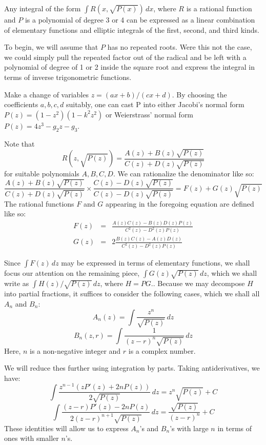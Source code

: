 \documentclass[12pt]{article}
\begin{document}
Any integral of the form $\int R(x,\sqrt{P(x)}) \, dx$, where $R$ is a rational 
function and $P$ is a polynomial of degree 3 or 4 can be expressed as a linear 
combination of elementary functions and elliptic integrals of the first, second, 
and third kinds.

To begin, we will assume that $P$ has no repeated roots.  Were this not the case, 
we could simply pull the repeated factor out of the radical and be left with a 
polynomial of degree of 1 or 2 inside the square root and express the integral in 
terms of inverse trigonometric functions.

Make a change of variables $z = (a x + b) / (c x + d)$.  By choosing the coefficients 
$a, b, c, d$ suitably, one can cast P into either Jacobi's normal form 
$P(z) = (1 - z^2) (1 - k^2 z^2)$ or Weierstrass' normal form 
$P(z) = 4 z^3 - g_2 z - g_3$.

Note that 
 \[R (z, \sqrt{P(z)}) = \frac{A(z) + B(z) \sqrt{P(z)}}{C(z) + D(z) \sqrt{P(z)}}\]
for suitable polynomials $A, B, C, D$.  We can rationalize the denominator like so:
 \[\frac{A(z) + B(z) \sqrt{P(z)}}{C(z) + D(z) \sqrt{P(z)}} \times \frac{C(z) -
D(z) \sqrt{P(z)}}{C(z) - D(z) \sqrt{P(z)}} = F(z) + G(z) \sqrt{P(z)}\]
The rational functions $F$ and $G$ appearing in the foregoing equation are defined like so:
\begin{eqnarray*} F(z) &=& \frac{A(z) C(z) - B(z) D(z) P(z)}{C^2 (z) - D^2(z) P(z)} \\ G(z) &=& 2 \frac{B(z) C(z) - A(z) D(z)}{C^2 (z) - D^2(z) P(z)} \end{eqnarray*}

Since $\int F(z) \, dz$ may be expressed in terms of elementary functions, 
we shall focus our attention on the remaining piece, $\int G(z) \sqrt{P(z)} \, dz$,
which we shall write as $\int H(z) / \sqrt{P(z)} \, dz$, where $H = PG$.. 
Because we may decompose $H$ into partial fractions, it suffices to consider
the following cases, which we shall all $A_n$ and $B_n$: 
 \[ A_n(z) = \int \frac{z^n}{\sqrt{P(z)}} \, dz\]
 \[ B_n(z,r) = \int \frac{1}{(z - r)^n \sqrt{P(z)}} \, dz\]
Here, $n$ is a non-negative integer and $r$ is a complex number.

We will reduce thes further using integration by parts.  
Taking antiderivatives, we have:
 \[ \int \frac{z^{n-1} (zP'(z) + 2nP(z))}{2\sqrt{P(z)}} \, dz = z^n \sqrt{P(z)} + C \]
 \[  \int \frac{(z-r) P'(z) - 2nP(z)}{2(z-r)^{n+1} \sqrt{P(z)}} \, dz
 = \frac{\sqrt{P(z)}}{(z-r)^n} + C \]
 These identities will allow us to express $A_n$'s and $B_n$'s with large
 $n$ in terms of ones with smaller $n$'s.
\end{document}
